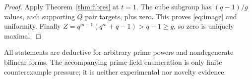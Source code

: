 \documentclass[a4paper,10pt]{amsart}
\theoremstyle{remark}
\newcommand{\1}{\mathbf 1}
\begin{document}
\begin{proof}
Apply Theorem~\ref{thm:fibres} at $t=1$.  The cube subgroup has
$(q-1)/g$ values, each supporting $Q$ pair targets, plus zero.  This proves
\eqref{eq:image} and uniformity.  Finally
$Z=q^{m-1}(q^m+q-1)>q-1\ge g$, so zero is uniquely maximal.
\end{proof}

All statements are deductive for arbitrary prime powers and nondegenerate
bilinear forms.  The accompanying prime-field enumeration is only finite
counterexample pressure; it is neither experimental nor novelty evidence.



\end{document}
